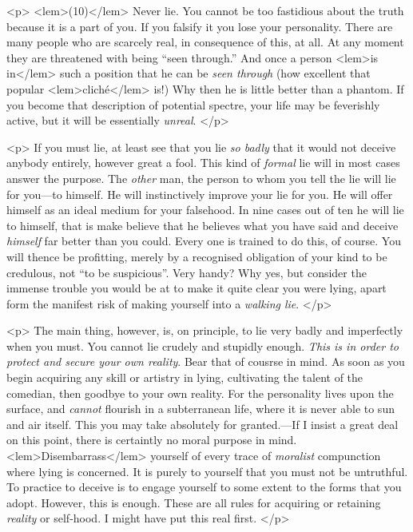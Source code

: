 {{				<p>
				\vspace{10pt}
				\noindent
<lem>(10)</lem>{}\hspace{20pt} Never lie. You cannot be too fastidious about the 
				truth because it is a part of 
				you. If you falsify it you lose your personality. There are many people who are 
				scarcely real, in consequence of this, at all. At any moment they are threatened with 
				being “seen through.” And once a person 
<lem>is in</lem>
					{} 
				such a position that he can be \emph{seen 
				through} (how excellent that popular 
<lem>clich\'e</lem> 
					{}
				is!) Why then he is little better than a 
				phantom. If you become that description of potential spectre, your life may be 
				feverishly active, but it will be essentially \emph{unreal}. 
 				</p> 

				<p>
				If you must lie, at least see that you lie \emph{so badly} that it would not deceive anybody 
				entirely, however great a fool. This kind of \emph{formal} lie will in most cases answer the 
				purpose. The \emph{other} man, the person to whom you tell the lie will lie for you---to 
				himself. He will instinctively improve your lie for you. He will offer himself as 
				an ideal medium for your falsehood. In nine cases out of ten he will lie to himself, that is 
				make believe that he believes what you have said and deceive \emph{himself} far better than 
				you could. Every one is trained to do this, of course. You will thence be profitting, 
				merely by a recognised obligation of your kind to be credulous, not “to be suspicious”. 
				Very handy? Why yes, but consider the immense trouble you would be at to make it quite 
				clear you were lying, apart form the manifest risk of making yourself into a 
				\emph{walking lie}. 
 				</p> 

				<p>
				The main thing, however, is, on principle, to lie very badly and imperfectly when you 
				must. You cannot lie crudely and stupidly enough. \emph{This is in order to protect and 
				secure your own reality}. Bear that of cousrse in mind. As soon as you begin acquiring 
				any skill or artistry in lying, cultivating the talent of the comedian, then goodbye 
				to your own reality. For the personality lives upon the surface, and \emph{cannot} flourish 
				in a subterranean life, where it is never able to sun and air itself. This you 
				may take absolutely for granted.---If I insist a great deal on this point, there is 
				certaintly no moral purpose in mind. 
<lem>Disembarrass</lem>
					{}
				yourself of every trace of \emph{moralist} 
				compunction where lying is concerned. It is purely to yourself that you must not 
				be untruthful. To practice to deceive is to engage yourself to some extent to the 
				forms that you adopt. However, this is enough. These are all rules for acquiring or 
				retaining \emph{reality} or self-hood. I might have put this real first. 
 				</p> 

}}
